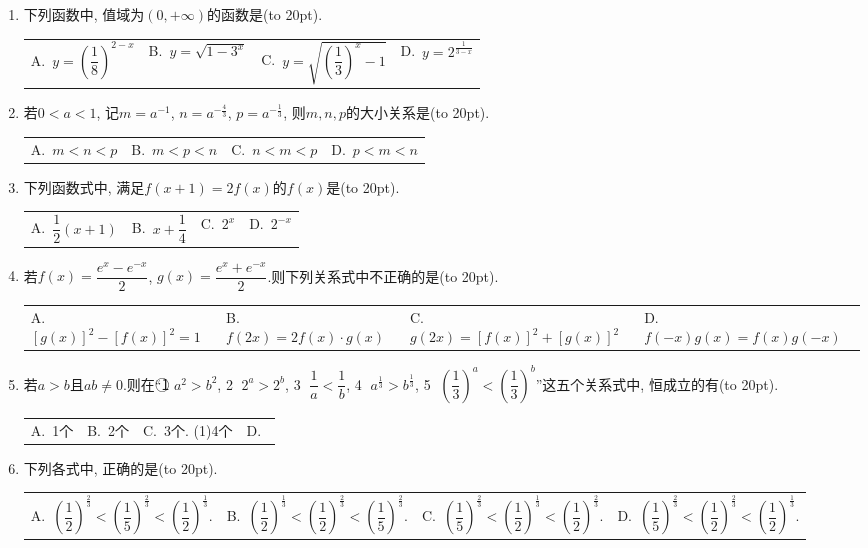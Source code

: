 \documentclass[10pt,a4paper]{article}
\newcommand{\blank}[1]{\underline{\hbox to #1pt{}}}
\newcommand{\bracket}[1]{(\hbox to #1pt{})}
\newcommand{\fourch}[4]{\par\begin{tabular}{p{.23\textwidth}p{.23\textwidth}p{.23\textwidth}p{.23\textwidth}}
A.~#1 &B.~#2& C.~#3& D.~#4
\end{tabular}}
\begin{document}
\begin{enumerate}[1.]
\textcircled{2} 当$1.5<x<4.5$时, $f(x)>h(x)>g(x)$;
\textcircled{3} 由$4.8<x<6.5$时, $h(x)>f(x)>g(x)$;
\textcircled{4} 当$6.5<x<7.4$时, $h(x)>g(x)>f(x)$;
\textcircled{5} 当$7.4<x<+\infty$时, $g(x)>h(x)>f(x)$;
⑥当$x=1.5,4.8,6.5,7.4$时, $f(x)=g(x)=h(x)$.
(2)它们在同一个平面直角坐标系下的图像如图14所示.
(图14)
由表格及图像可看出, 三个函数的函数值变化及相应增量规律为: 随着$x$的增大, 直线型均匀上升, 增量恒定; 指数型急剧上升, 在区间$[0,+\infty)$上递增增量快速增大; 幂函数型虽上升较快, 但随着$x$的不断增大上升趋势远不如指数型, 几乎微不足道, 其增量缓慢递增.
注意  一般地, 线性函数$y=ax+b$($a>0$)直线上升、指数函数$y=a^x$($a>1$)爆炸增长, 幂函数$y=x^{\alpha }$($\alpha \in \mathbf{Q}^+$)缓慢递增.无论$\alpha$比$a$大多少, 在$x$的一定变化范围内$a^x<x^{\alpha }$, 但随着$x$的增大, 由于的增长速度最终快于$y=x^{\alpha }$($\alpha \in \mathbf{Q}^+$)的增长速度, 因此总存在一个$x_0$, 当$x>x_0$时, 有$a^x>x^{\alpha }$.
133.已知函数$f(x)=4+a^{x-1}$的图象恒过记点$P$, 则点$P$的坐标是\bracket{20}.
\fourch{(1, 5)}{(1, 4)}{(0, 4)}{(4, 0)}
\item 下列函数中, 值域为$(0,+\infty)$的函数是\bracket{20}.
\fourch{$y=(\dfrac 18)^{2-x}$}{$y=\sqrt {1-3^x}$}{$y=\sqrt {(\dfrac 13)^x-1}$}{$y=2^{\frac 1{3-x}}$}
\item 若$0<a<1$, 记$m=a^{-1}$, $n=a^{-\frac 43}$, $p=a^{-\frac 13}$, 则$m,n,p$的大小关系是\bracket{20}.
\fourch{$m<n<p$}{$m<p<n$}{$n<m<p$}{$p<m<n$}
\item 下列函数式中, 满足$f(x+1)=2f(x)$的$f(x)$是\bracket{20}.
\fourch{$\dfrac 12(x+1)$}{$x+\dfrac 14$}{$2^x$	}{$2^{-x}$}
\item 若$f(x)=\dfrac{e^x-e^{-x}}2$, $g(x)=\dfrac{e^x+e^{-x}}2$.则下列关系式中不正确的是\bracket{20}.
\fourch{$[g(x)]^2-[f(x)]^2=1$}{$f(2x)=2f(x)\cdot g(x)$}{$g(2x)=[f(x)]^2+[g(x)]^2$}{$f(-x)g(x)=f(x)g(-x)$}
\item 若$a>b$且$ab\ne 0$.则在``\textcircled{1} $a^2>b^2$, \textcircled{2} $2^a>2^b$, \textcircled{3} $\dfrac 1a<\dfrac 1b$, \textcircled{4} $a^{\frac 13}>b^{\frac 13}$, \textcircled{5} $(\dfrac 13)^a<(\dfrac 13)^b$''这五个关系式中, 恒成立的有\bracket{20}.
\fourch{1个}{2个}{3个.			(1)4个
\item 在同一平面直角坐标系中, 函数$f(x)=ax$与$g(x)=a^x$的图象可能是\bracket{20}.
\blank{50}(A)\blank{50}(B)\blank{50}(C)}{}
\item 下列各式中, 正确的是\bracket{20}.
\fourch{$(\dfrac 12)^{\frac 23}<(\dfrac 15)^{\frac 23}<(\dfrac 12)^{\frac 13}.$}{$(\dfrac 12)^{\frac 13}<(\dfrac 12)^{\frac 23}<(\dfrac 15)^{\frac 23}.$}{$(\dfrac 15)^{\frac 23}<(\dfrac 12)^{\frac 13}<(\dfrac 12)^{\frac 23}.$}{$(\dfrac 15)^{\frac 23}<(\dfrac 12)^{\frac 23}<(\dfrac 12)^{\frac 13}.$}

\end{enumerate}
\end{document}
